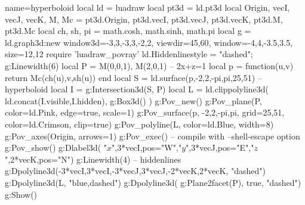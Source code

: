 \documentclass[border=5pt]{standalone}%
\begin{document}
\begin{luadraw}{name=hyperboloid}
local ld = luadraw
local pt3d = ld.pt3d
local Origin, vecI, vecJ, vecK, M, Mc = pt3d.Origin, pt3d.vecI, pt3d.vecJ, pt3d.vecK, pt3d.M, pt3d.Mc
local ch, sh, pi = math.cosh, math.sinh, math.pi
local g = ld.graph3d:new{ window3d={-3,3,-3,3,-2,2}, viewdir={45,60}, 
    window={-4,4,-3.5,3.5}, size={12,12}}
require 'luadraw_povray'
ld.Hiddenlinestyle = "dashed"; g:Linewidth(6)
local P = {M(0,0,1), M(2,0,1)} -- 2x+z=1
local p = function(u,v) 
    return Mc(ch(u),v,sh(u)) 
end
local S = ld.surface(p,-2,2,-pi,pi,{25,51}) -- hyperboloid
local I = g:Intersection3d(S, P)
local L = ld.clippolyline3d( ld.concat(I.visible,I.hidden), g:Box3d() )
g:Pov_new()
g:Pov_plane(P, {color=ld.Pink, edge=true, scale=1})
g:Pov_surface(p, -2,2,-pi,pi, { grid={25,51}, color=ld.Crimson, clip=true})
g:Pov_polyline(L, {color=ld.Blue, width=8})
g:Pov_axes(Origin, {arrows=1})
g:Pov_exec() -- compile with --shell-escape option
g:Pov_show()
g:Dlabel3d( "$x$",3*vecI,{pos="W"},"$y$",3*vecJ,{pos="E"},"$z$",2*vecK,{pos="N"})
g:Linewidth(4) -- hiddenlines
g:Dpolyline3d({{-3*vecI,3*vecI},{-3*vecJ,3*vecJ},{-2*vecK,2*vecK}}, "dashed")
g:Dpolyline3d(L, "blue,dashed")
g:Dpolyline3d( g:Plane2facet(P), true, "dashed")
g:Show()
\end{luadraw}
\end{document}
